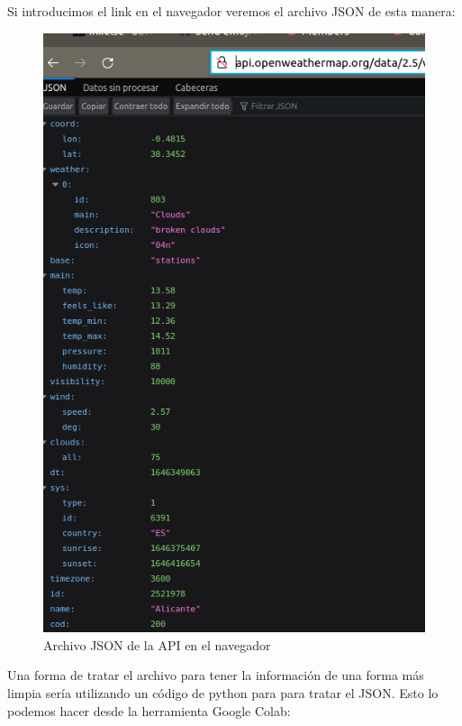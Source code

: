 \documentclass[12pt]{article}
\begin{document}
Si introducimos el link en el navegador veremos el archivo JSON  de esta manera:    


\begin{figure}[H]
    \centering
    \includegraphics[scale=0.5]{alicantenav.png}
    \caption{Archivo JSON de la API en el navegador}
    \label{fig: alicantenav}
\end{figure}

Una forma de tratar el archivo para tener la información de una forma más limpia sería
utilizando un código de python para para tratar el JSON. Esto lo podemos hacer desde la herramienta Google Colab:
\end{document}
